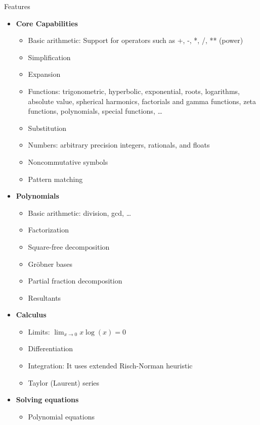 \documentclass[xcolor=svgnames]{beamer}
\begin{document}
\begin{frame}{Features}
  \begin{multicols}{2}
    \tiny
    \begin{itemize}
    \item \textbf{Core Capabilities}
      \begin{itemize}
        \tiny
      \item Basic arithmetic: Support for operators such as +, -, *, /, ** (power)
      \item Simplification
      \item Expansion
      \item Functions: trigonometric, hyperbolic, exponential, roots, logarithms,
        absolute value, spherical harmonics, factorials and gamma functions, zeta
        functions, polynomials, special functions, \ldots
      \item Substitution
      \item Numbers: arbitrary precision integers, rationals, and floats
      \item Noncommutative symbols
      \item Pattern matching
      \end{itemize}
    \item \textbf{Polynomials}
      \begin{itemize}
        \tiny
      \item Basic arithmetic: division, gcd, \ldots
      \item Factorization
      \item Square-free decomposition
      \item Gröbner bases
      \item Partial fraction decomposition
      \item Resultants
      \end{itemize}
    \item \textbf{Calculus}
      \begin{itemize}
        \tiny
      \item Limits: $\lim_{x\to 0}{x\log(x)} = 0$
      \item Differentiation
      \item Integration: It uses extended Risch-Norman heuristic
      \item Taylor (Laurent) series
      \end{itemize}
    \item \textbf{Solving equations}
      \begin{itemize}
        \tiny
      \item Polynomial equations

\end{itemize}
\end{itemize}
\end{multicols}
\end{frame}
\end{document}
